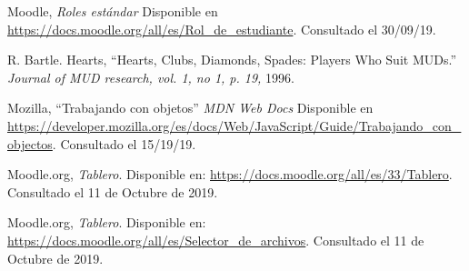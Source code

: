 \begin{thebibliography}{9}
        Moodle, {\it Roles estándar}
        Disponible en \url{https://docs.moodle.org/all/es/Rol_de_estudiante}.
        Consultado el 30/09/19.

        R. Bartle. Hearts,
        ``Hearts, Clubs, Diamonds, Spades: Players Who Suit MUDs.''
        \textit{Journal of MUD research, vol. 1, no 1, p. 19,} 1996.


        Mozilla,
        ``Trabajando con objetos''
        \textit{MDN Web Docs} Disponible en
        \url{https://developer.mozilla.org/es/docs/Web/JavaScript/Guide/Trabajando_con_objectos}.
        Consultado el 15/19/19.

        Moodle.org, {\it Tablero}.
        Disponible en: \url{https://docs.moodle.org/all/es/33/Tablero}.
        Consultado el 11 de Octubre de 2019.

        Moodle.org, {\it Tablero}.
        Disponible en: \url{https://docs.moodle.org/all/es/Selector_de_archivos}.
        Consultado el 11 de Octubre de 2019.










\end{thebibliography}
